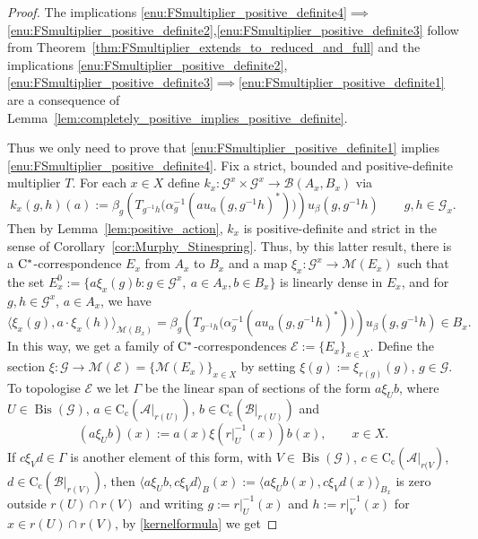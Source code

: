 \documentclass[10pt,a4paper]{amsart}
\newcommand{\A}{\mathcal A}
\newcommand{\B}{\mathcal B}
\DeclareMathOperator{\Bis}{Bis}
\newcommand{\EE}{\mathcal E}
\newcommand{\G}{\mathcal G} %
\newcommand{\M}{\mathcal M}
\newcommand*{\contc}{\mathrm{C_c}}%
\newcommand{\cst}{\ifmmode\mathrm{C}^*\else{$\mathrm{C}^*$}\fi}
\begin{document}
\begin{proof} 
The implications \ref{enu:FSmultiplier_positive_definite4}$\implies$\ref{enu:FSmultiplier_positive_definite2},\ref{enu:FSmultiplier_positive_definite3} follow from Theorem~\ref{thm:FSmultiplier_extends_to_reduced_and_full} and the implications \ref{enu:FSmultiplier_positive_definite2},\ref{enu:FSmultiplier_positive_definite3}$\implies$\ref{enu:FSmultiplier_positive_definite1} are a consequence of Lemma~\ref{lem:completely_positive_implies_positive_definite}.

Thus we only need to prove that \ref{enu:FSmultiplier_positive_definite1} implies \ref{enu:FSmultiplier_positive_definite4}. 
Fix a strict, bounded  and positive-definite multiplier $T$. 
For each $x \in X$ define $k_x : \G^x \times \G^x \to \B(A_x,B_x)$ via
\[
    k_x(g, h)(a) := \beta_{g} \left(T_{g^{-1} h} \big( \alpha_g^{-1} (au_{\alpha}(g,g^{-1}h)^*) \big) \right) u_{\beta} (g,g^{-1}h) %
    \qquad g, h \in \G_x. 
\]
Then by Lemma~\ref{lem:positive_action}, $k_x$ is positive-definite and strict in the sense of Corollary~\ref{cor:Murphy_Stinespring}. 
Thus, by this latter result, there is a $\cst$-correspondence $E_x$ from $A_x$ to $B_x$ and a map $\xi_x : \G^x \to \M(E_x)$ such that the set $E_x^0 := \{ a \xi_x(g)b : g \in \G^x ,\ a \in A_x, b \in B_x \}$ is linearly dense in $E_x$, and for $g, h \in \G^x$, $a \in A_x$, we have 
\begin{equation} \label{kernelformula}
    \langle \xi_x(g), a \cdot \xi_x(h) \rangle_{\M(B_x)} =  \beta_{g} \left(T_{g^{-1} h} \big(\alpha_g^{-1}(au_{\alpha}(g,g^{-1}h)^*) \big) \right)u_{\beta}(g,g^{-1}h) \in B_x. 
\end{equation}
In this way, we get a family of $\cst$-correspondences $\EE:=\{E_x\}_{x\in X}$. 
Define the section $\xi : \G \to \M(\EE) = \{ \M(E_x) \}_{x\in X}$ by setting $\xi(g):=\xi_{r(g)}(g)$, $g \in \G$.
To topologise $\EE$ we let $\Gamma$ be the linear span of sections of the form $a\xi_U b$, where $U\in \Bis(\G)$, $a\in \contc(\A|_{r(U)})$, $b\in \contc(\B|_{r(U)})$ and
\[
    (a\xi_U b)(x) := a(x) \xi(r|_{U}^{-1}(x))b(x) , \qquad x\in X.
\]
If $c\xi_V d\in \Gamma$ is another element of this form, with $V\in \Bis(\G)$, $c\in \contc(\A|_{r(V})$, $d\in \contc (\B|_{r(V)})$, then $\langle a\xi_U b, c \xi_V d\rangle_{B} (x):=  \langle a\xi_U b(x), c \xi_V d (x)\rangle_{B_x}$ is zero outside $r(U)\cap r(V)$ and writing $g := r|_{U}^{-1}(x)$ and $h := r|_{V}^{-1}(x)$ for $x\in r(U)\cap r(V)$, by \eqref{kernelformula} we get 

\end{proof}
\end{document}
